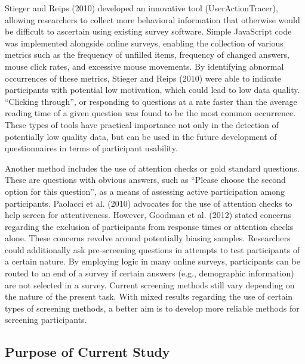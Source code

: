 \documentclass[english,man]{apa6}
\theoremstyle{definition}
\theoremstyle{definition}
\theoremstyle{definition}
\theoremstyle{remark}
\begin{document}
Stieger and Reips (2010) developed an innovative tool
(UserActionTracer), allowing researchers to collect more behavioral
information that otherwise would be difficult to ascertain using
existing survey software. Simple JavaScript code was implemented
alongside online surveys, enabling the collection of various metrics
such as the frequency of unfilled items, frequency of changed answers,
mouse click rates, and excessive mouse movements. By identifying
abnormal occurrences of these metrics, Stieger and Reips (2010) were
able to indicate participants with potential low motivation, which could
lead to low data quality. \enquote{Clicking through}, or responding to
questions at a rate faster than the average reading time of a given
question was found to be the most common occurrence. These types of
tools have practical importance not only in the detection of potentially
low quality data, but can be used in the future development of
questionnaires in terms of participant usability.

Another method includes the use of attention checks or gold standard
questions. These are questions with obvious answers, such as
\enquote{Please choose the second option for this question}, as a means
of assessing active participation among participants. Paolacci et al.
(2010) advocates for the use of attention checks to help screen for
attentiveness. However, Goodman et al. (2012) stated concerns regarding
the exclusion of participants from response times or attention checks
alone. These concerns revolve around potentially biasing samples.
Researchers could additionally ask pre-screening questions in attempts
to test participants of a certain nature. By employing logic in many
online surveys, participants can be routed to an end of a survey if
certain answers (e.g., demographic information) are not selected in a
survey. Current screening methods still vary depending on the nature of
the present task. With mixed results regarding the use of certain types
of screening methods, a better aim is to develop more reliable methods
for screening participants.

\subsection{Purpose of Current Study}\label{purpose-of-current-study}
\end{document}
